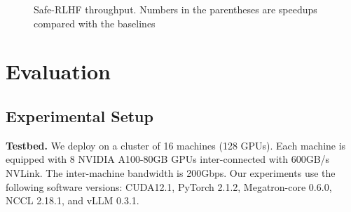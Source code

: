 \begin{figure}[t]
\hspace{-2mm}
\hspace{-2mm}
\vspace{-5mm}
\caption{Safe-RLHF throughput. Numbers in the parentheses are \sysname{} speedups compared with the baselines}
\vspace{-3mm}
\label{fig:safe_rlhf_train_throughput}
\end{figure}

\section{Evaluation}

\subsection{Experimental Setup}
\textbf{Testbed.} We deploy \sysname{} on a cluster of 16 machines (128 GPUs). Each machine is equipped with 8 NVIDIA A100-80GB GPUs inter-connected with 600GB/s NVLink. The inter-machine bandwidth is 200Gbps. Our experiments use the following software versions: CUDA12.1, PyTorch 2.1.2, Megatron-core 0.6.0, NCCL 2.18.1, and vLLM 0.3.1.


